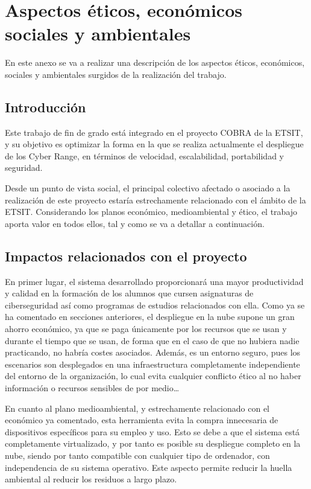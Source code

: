 \appendix
\clearpage
\addappheadtotoc
\appendixpage


\chapter{Aspectos éticos, económicos sociales y ambientales } \label{anx:et}
  En este anexo se va a realizar una descripción de los aspectos éticos, económicos, sociales y ambientales surgidos de la realización del trabajo. 

\section*{Introducción}
  Este trabajo de fin de grado está integrado en el proyecto COBRA de la ETSIT, y su objetivo es optimizar la forma en la que se realiza actualmente el despliegue de los Cyber Range, en términos de velocidad, escalabilidad, portabilidad y seguridad. 

  Desde un punto de vista social, el principal colectivo afectado o asociado a la realización de este proyecto estaría estrechamente relacionado con el ámbito de la ETSIT. Considerando los planos económico, medioambiental y ético, el trabajo aporta valor en todos ellos, tal y como se va a detallar a continuación. 

\section*{Impactos relacionados con el proyecto}
  En primer lugar, el sistema desarrollado proporcionará una mayor productividad y calidad en la formación de los alumnos que cursen asignaturas de ciberseguridad así como programas de estudios relacionados con ella. Como ya se ha comentado en secciones anteriores, el despliegue en la nube supone un gran ahorro económico, ya que se paga únicamente por los recursos que se usan y durante el tiempo que se usan, de forma que en el caso de que no hubiera nadie practicando, no habría costes asociados. Además, es un entorno seguro, pues los escenarios son desplegados en una infraestructura completamente independiente del entorno de la organización, lo cual evita cualquier conflicto ético al no haber información o recursos sensibles de por medio\dots

  En cuanto al plano medioambiental, y estrechamente relacionado con el económico ya comentado, esta herramienta evita la compra innecesaria de dispositivos específicos para su empleo y uso. Esto se debe a que el sistema está completamente virtualizado, y por tanto es posible su despliegue completo en la nube, siendo por tanto compatible con cualquier tipo de ordenador, con independencia de su sistema operativo. Este aspecto permite reducir la huella ambiental al reducir los residuos a largo plazo.

